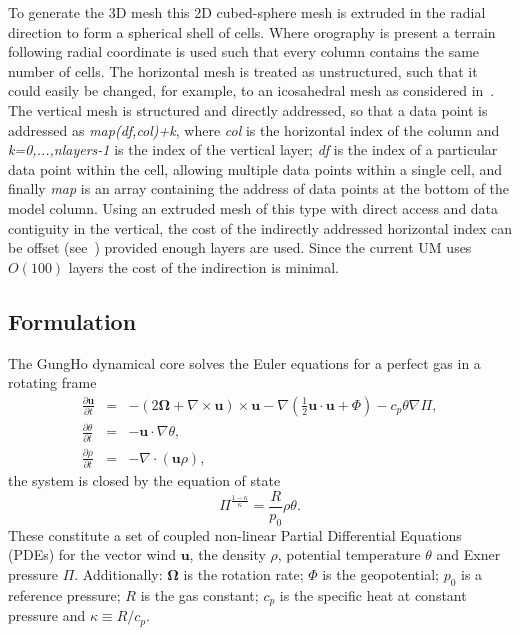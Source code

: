 \documentclass[review,times]{elsarticle}
\begin{document}
To generate the 3D mesh this 2D cubed-sphere mesh is extruded in the radial 
direction to form a spherical shell of cells. Where orography is present a terrain
following radial coordinate is used such that every column contains the
same number of cells. The horizontal mesh is treated as unstructured,
such that it could easily be changed, for example, to an icosahedral mesh as
considered in~\cite{staniforth2012}.
The vertical mesh is structured and directly addressed, so that
a data point is addressed as \textit{map(df,col)+k}, where \textit{col}
is the horizontal index of the column and \textit{k=0,...,nlayers-1} is
the index of the vertical layer; \textit{df} is the index of a particular
data point within the cell, allowing multiple data points within a single cell, and 
finally \textit{map} is an array containing the address of data points at 
the bottom of the model column.
Using an extruded mesh of this type with direct access and data contiguity
in the vertical, the cost of the indirectly addressed horizontal index can 
be offset (see~\cite{doi:10.1177/1094342010385019}) provided enough layers are used. 
Since the current UM uses~$O(100)$ layers the cost of the indirection is minimal.
%

\subsection{Formulation\label{sec:sub:formulation}}

The GungHo dynamical core solves the Euler equations for a perfect gas in a 
rotating frame
%
\begin{eqnarray}
\frac{\partial\mathbf{u}}{\partial t} & = & -\left(2\bm{\Omega}+\nabla\times\mathbf{u}\right)\times\mathbf{u} - \nabla\left(\frac{1}{2}\mathbf{u}\cdot\mathbf{u} + \Phi\right) - c_p\theta\nabla\Pi,\label{eq:momentum}\\
\frac{\partial\theta}{\partial t} & = & - \mathbf{u}\cdot\nabla\theta,\label{eq:energy}\\
\frac{\partial\rho}{\partial t} & = & - \nabla\cdot\left(\mathbf{u}\rho\right)\label{eq:continuity},
\end{eqnarray}
%
the system is closed by the equation of state
%
\begin{equation}
\Pi^{\frac{1-\kappa}{\kappa}} = \frac{R}{p_0}\rho\theta.\label{eq:eos}
\end{equation}
%
These constitute a set of coupled non-linear Partial Differential
Equations (PDEs) for the vector wind $\mathbf{u}$, 
the density $\rho$, potential temperature $\theta$ and Exner pressure $\Pi$. 
Additionally: $\bm{\Omega}$ is the rotation rate; $\Phi$ is the geopotential; 
$p_0$ is a reference pressure; $R$ is the gas constant; $c_p$ is the specific 
heat at constant pressure and $\kappa\equiv R/c_p$.
\end{document}
